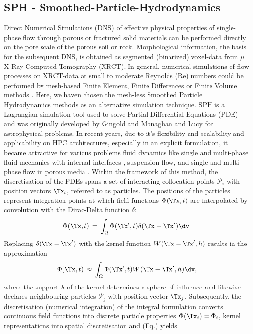 \subsection{SPH - Smoothed-Particle-Hydrodynamics}
Direct Numerical Simulations (DNS) of effective physical properties of single-phase flow through porous or fractured solid materials can be performed directly on the pore scale of the porous soil or rock. Morphological information, the basis for the subsequent DNS, is obtained as segmented (binarized) voxel-data from $\mu$ X-Ray Computed Tomography (XRCT). In general, numerical simulations of flow processes on XRCT-data at small to moderate Reynolds (Re) numbers could be performed by mesh-based Finite Element, Finite Differences or Finite Volume methods .
Here, we haven chosen the mesh-less Smoothed Particle Hydrodynamics methods as an alternative simulation technique. SPH is a Lagrangian simulation tool used to solve Partial Differential Equations (PDE) and was originally
developed by Gingold and Monaghan and Lucy for astrophysical problems. In recent years, due to it's flexibility and
scalability and applicability on HPC architectures, especially in an explicit formulation,
it became attractive for various problems fluid dynamics like single and multi-phase fluid mechanics with internal interfaces , suspension flow,  and single and multi-phase flow in porous media .
Within the framework of this method, the discretisation of the PDEs spans a set of interacting collocation points $\mathcal{P}_i$ with position vectors $\Tx_i$, referred to as particles. The positions of the particles represent integration points at which field functions $\Phi (\Tx, t) $ are interpolated by convolution with the Dirac-Delta function $\delta$:
\begin{equation}
\label{eq:SPH_dirac_delta}
    \Phi (\Tx, t) \, = \, \int_\Omega \Phi (\Tx', t) \delta(\Tx - \Tx') \dv.
\end{equation}
Replacing $\delta(\Tx -  \Tx')$ with the kernel function $ W(\Tx - \Tx', h)$ results in the approximation
\begin{equation}
\label{eq:SPH_replacement_kernel}
    \Phi (\Tx, t) \, \approx \, \int_\Omega \Phi (\Tx', t) W(\Tx  -  \Tx', h) \dv,
\end{equation}
where the support $h$ of the kernel determines a sphere of influence and likewise declares neighbouring particles $\mathcal{P}_j$ with position vector $\Tx_j$. Subsequently, the discretisation (numerical integration) of the integral formulation converts continuous field functions into discrete particle properties  $\Phi (\Tx_i) = \Phi_i$, kernel representations into spatial discretisation and (Eq.) yields 
